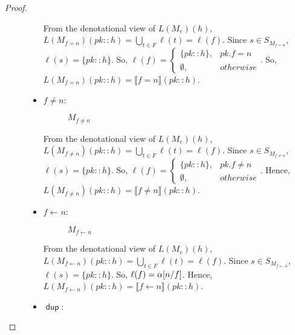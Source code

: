 \documentclass{article}
\newcommand\den[1]{\llbracket #1\rrbracket}
\newcommand\pdup{\mathop{\mathsf{dup}}}
\begin{document}
\begin{proof}
\begin{description}
\begin{itemize}
  From the denotational view of $L(M_e)(h)$,
  $L(M_{f=n})(pk::h) = \bigcup_{t\in F}\ell(t) = \ell(f)$. Since 
  $s \in S_{M_{f=n}}$, $\ell(s) = \{pk::h\}$. So, 
  $\ell(f) = \begin{cases} \{pk::h\}, & pk.f = n \\ \emptyset, 
  & otherwise \end{cases}$. So, $L(M_{f=n})(pk::h) = \den{f=n}(pk::h)$.


  \item $f \neq n$:
  \begin{figure}[H]
    \centering
    \caption{$M_{f \neq n}$}
  \end{figure}
  
  From the denotational view of $L(M_e)(h)$,
  $L(M_{f \neq n})(pk::h) = \bigcup_{t\in F}\ell(t) = \ell(f)$. Since 
  $s \in S_{M_{f \neq n}}$, $\ell(s) = \{pk::h\}$. So, 
  $\ell(f) = \begin{cases} \{pk::h\}, & pk.f \neq n \\ \emptyset, 
  & otherwise \end{cases}$. Hence, 
  $L(M_{f \neq n})(pk::h) = \den{f \neq n}(pk::h)$.
  
  \item $f \gets n$:
  \begin{figure}[H]
    \centering
    \caption{$M_{f \gets n}$}
  \end{figure}
  
  From the denotational view of $L(M_e)(h)$,
  $L(M_{f \gets n})(pk::h) = \bigcup_{t\in F}\ell(t) = \ell(f)$. Since 
  $s \in S_{M_{f \gets n}}$, $\ell(s) = \{pk::h\}$. So, 
  $\ell(f) = \alpha[n/f]$. Hence, 
  $L(M_{f \gets n})(pk::h) = \den{f \gets n}(pk::h)$.
  
  \item $\pdup$:
  \begin{figure}[H]
    \centering
\end{figure}
\end{itemize}
\end{description}
\end{proof}
\end{document}
